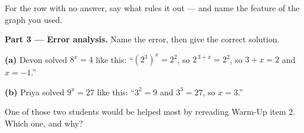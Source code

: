 \documentclass[10pt]{article}
\begin{document}
\begin{tcolorbox}[colback=white, colframe=black!40, title=\textbf{Tier A --- Approaching Proficiency},
    fonttitle=\bfseries, arc=1.5mm, left=3mm, right=3mm, top=2mm, bottom=2mm, breakable]
\vspace{2pt}
For the row with no answer, say what rules it out --- and name the feature of the graph you used.
\blank{7.5cm}

\vspace{5pt}
\textbf{Part 3 --- Error analysis.} Name the error, then give the correct solution.

\vspace{2pt}
\textbf{(a)} Devon solved $8^{x}=4$ like this: ``$\left(2^{3}\right)^{x}=2^{2}$, so $2^{\,3+x}=2^{2}$,
so $3+x=2$ and $x=-1$.'' 

\vspace{2pt}
\textbf{(b)} Priya solved $9^{x}=27$ like this: ``$3^{2}=9$ and $3^{3}=27$, so $x=3$.''

\vspace{2pt}
One of those two students would be helped most by rereading Warm-Up item 2. Which one, and why?
\blank{7.0cm}
\end{tcolorbox}
\end{document}
